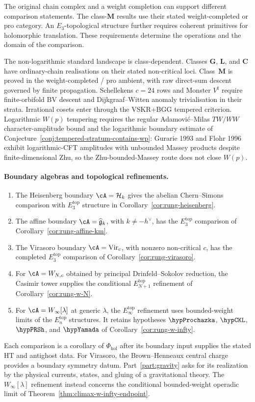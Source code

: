 The original chain complex and a weight completion can support different
comparison statements. The class-$\mathbf M$ results use their stated
weight-completed or pro category. An $E_3$-topological structure further
requires coherent primitives for holomorphic translation. These
requirements determine the operations and the domain of the comparison.

The non-logarithmic standard landscape is class-dependent. Classes
$\mathbf G$, $\mathbf L$, and $\mathbf C$ have ordinary-chain
realisations on their stated non-critical loci. Class~$\mathbf M$
is proved in the weight-completed / pro ambient, with raw
direct-sum descent governed by finite propagation. Schellekens
$c=24$ rows and Monster $V^\natural$ require finite-orbifold BV
descent and Dijkgraaf--Witten anomaly trivialisation in their
strata. Irrational cosets enter through the VSKR+BGG tempered
criterion.
Logarithmic $W(p)$ tempering requires the regular
Adamovi\'c--Milas $TW/WW$ character-amplitude bound and the logarithmic
boundary estimate of
Conjecture~\ref{conj:tempered-stratum-contains-wp}: Gurarie 1993
and Flohr 1996 exhibit logarithmic-CFT amplitudes with unbounded
Massey products despite finite-dimensional Zhu, so the
Zhu-bounded-Massey route does not close $W(p)$.

\paragraph{Boundary algebras and topological refinements.}
\begin{enumerate}
\item The Heisenberg boundary $\cA=\cH_k$ gives the abelian
Chern--Simons comparison with $E_3^{\mathrm{top}}$ structure in
Corollary~\ref{cor:rung-heisenberg}.
\item The affine boundary $\cA=\widehat{\fg}_k$, with
$k\ne-h^\vee$, has the $E_3^{\mathrm{top}}$ comparison of
Corollary~\ref{cor:rung-affine-km}.
\item The Virasoro boundary $\cA=\mathrm{Vir}_c$, with nonzero
non-critical $c$, has the completed $E_3^{\mathrm{top}}$ comparison
of Corollary~\ref{cor:rung-virasoro}.
\item For $\cA=W_{N,c}$ obtained by principal Drinfeld--Sokolov
reduction, the Casimir tower supplies the conditional
$E_{N+1}^{\mathrm{top}}$ refinement of
Corollary~\ref{cor:rung-w-N}.
\item For $\cA=W_\infty[\lambda]$ at generic $\lambda$, the
$E_\infty^{\mathrm{top}}$ refinement uses bounded-weight limits
of the $E_n^{\mathrm{top}}$ structures. It retains hypotheses
$\hypProchazka$, $\hypCKL$, $\hypPRSh$, and $\hypYamada$
of Corollary~\ref{cor:rung-w-infty}.
\end{enumerate}
Each comparison is a corollary of $\Phi_{\mathrm{hol}}$ after its
boundary input supplies the stated HT and antighost data.
For Virasoro, the Brown--Henneaux central charge provides a boundary
symmetry datum. Part~\ref{part:gravity} asks for its realization by the
physical currents, states, and gluing of a gravitational theory.
The $W_\infty[\lambda]$ refinement instead concerns the conditional
bounded-weight operadic limit of
Theorem~\ref{thm:climax-w-infty-endpoint}.

